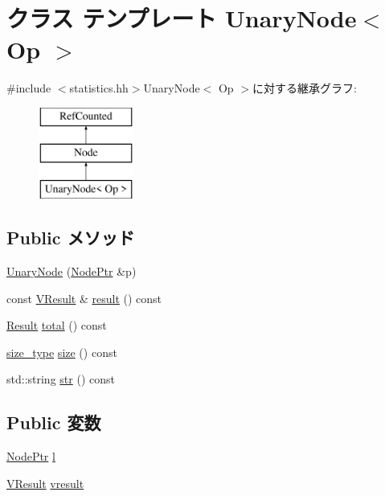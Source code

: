 \hypertarget{classStats_1_1UnaryNode}{
\section{クラス テンプレート UnaryNode$<$ Op $>$}
\label{classStats_1_1UnaryNode}
}


{\ttfamily \#include $<$statistics.hh$>$}UnaryNode$<$ Op $>$に対する継承グラフ:\begin{figure}[H]
\begin{center}
\leavevmode
\includegraphics[height=3cm]{classStats_1_1UnaryNode}
\end{center}
\end{figure}
\subsection*{Public メソッド}
\begin{DoxyCompactItemize}
\item 
\hyperlink{classStats_1_1UnaryNode_abe175a290c9aece53b666c30cda21168}{UnaryNode} (\hyperlink{classRefCountingPtr}{NodePtr} \&p)
\item 
const \hyperlink{classstd_1_1vector}{VResult} \& \hyperlink{classStats_1_1UnaryNode_aba312f9e3431b1652f8b3ddf3fe105dc}{result} () const 
\item 
\hyperlink{namespaceStats_ad874d2cfd4b4a29ebd480bb2e67f20ae}{Result} \hyperlink{classStats_1_1UnaryNode_a35c6e2ed3fc81b40d69052a062113ead}{total} () const 
\item 
\hyperlink{namespaceStats_ada51e68d31936547d3729c82daf6b7c6}{size\_\-type} \hyperlink{classStats_1_1UnaryNode_a503ab01f6c0142145d3434f6924714e7}{size} () const 
\item 
std::string \hyperlink{classStats_1_1UnaryNode_a1b9b8885b0880fc4ddf9a2c7d1ca3dc4}{str} () const 
\end{DoxyCompactItemize}
\subsection*{Public 変数}
\begin{DoxyCompactItemize}
\item 
\hyperlink{classRefCountingPtr}{NodePtr} \hyperlink{classStats_1_1UnaryNode_a6ad7f056f60bd5cfec2caa5d5f4e363f}{l}
\item 
\hyperlink{classstd_1_1vector}{VResult} \hyperlink{classStats_1_1UnaryNode_a8f41af856442757ec68f3391333d3eb2}{vresult}
\end{DoxyCompactItemize}
